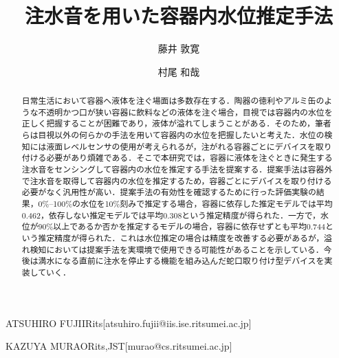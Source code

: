 \documentclass[submit,techrep,noauthor]{ipsj}
\begin{document}
\title{注水音を用いた容器内水位推定手法}





\author{藤井 敦寛}{ATSUHIRO FUJII}{Rits}[atsuhiro.fujii@iis.ise.ritsumei.ac.jp]
\author{村尾 和哉}{KAZUYA MURAO}{Rits,JST}[murao@cs.ritsumei.ac.jp]

\begin{abstract}
  日常生活において容器へ液体を注ぐ場面は多数存在する．陶器の徳利やアルミ缶のような不透明かつ口が狭い容器に飲料などの液体を注ぐ場合，目視では容器内の水位を正しく把握することが困難であり，液体が溢れてしまうことがある．そのため，筆者らは目視以外の何らかの手法を用いて容器内の水位を把握したいと考えた．水位の検知には液面レベルセンサの使用が考えられるが，注がれる容器ごとにデバイスを取り付ける必要があり煩雑である．そこで本研究では，容器に液体を注ぐときに発生する注水音をセンシングして容器内の水位を推定する手法を提案する．提案手法は容器外で注水音を取得して容器内の水位を推定するため，容器ごとにデバイスを取り付ける必要がなく汎用性が高い．提案手法の有効性を確認するために行った評価実験の結果，0\%--100\%の水位を10\%刻みで推定する場合，容器に依存した推定モデルでは平均0.462，依存しない推定モデルでは平均0.308という推定精度が得られた．一方で，水位が90\%以上であるか否かを推定するモデルの場合，容器に依存せずとも平均0.744という推定精度が得られた．これは水位推定の場合は精度を改善する必要があるが，溢れ検知においては提案手法を実環境で使用できる可能性があることを示している．今後は満水になる直前に注水を停止する機能を組み込んだ蛇口取り付け型デバイスを実装していく．
\end{abstract}


%
%
%
\end{document}

